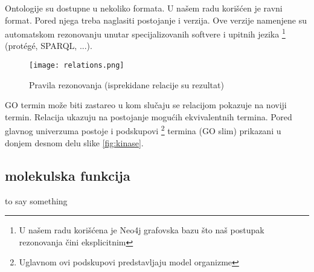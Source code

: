 Ontologije su dostupne u nekoliko formata. U našem radu korišćen je ravni
 format.  Pored njega treba naglasiti postojanje  i
 verzija.  Ove verzije namenjene su automatskom rezonovanju unutar
specijalizovanih softvere i upitnih jezika \footnote{U našem radu korišćena je
Neo4j grafovska bazu što naš postupak rezonovanja čini eksplicitnim} (protégé,
SPARQL, ...).

\begin{figure}[h!]
  \centering
  \texttt{[image: relations.png]}
  \caption{Pravila rezonovanja (isprekidane relacije su rezultat)}
  \label{fig:relations}
\end{figure}

GO termin može biti zastareo u kom slučaju se relacijom 
pokazuje na noviji termin. Relacija  ukazuju na
postojanje mogućih ekvivalentnih termina. Pored glavnog univerzuma postoje i
podskupovi \footnote{Uglavnom ovi podskupovi predstavljaju model organizme}
termina (GO slim) prikazani u donjem desnom delu slike \ref{fig:kinase}.


\subsection{molekulska funkcija}
to say something \parencite{go_mf}










